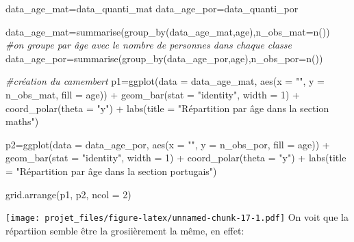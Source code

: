 \documentclass[
]{article}
\newenvironment{Shaded}{\begin{snugshade}}{\end{snugshade}}
\newcommand{\AttributeTok}[1]{\textcolor[rgb]{0.77,0.63,0.00}{#1}}
\newcommand{\CommentTok}[1]{\textcolor[rgb]{0.56,0.35,0.01}{\textit{#1}}}
\newcommand{\DecValTok}[1]{\textcolor[rgb]{0.00,0.00,0.81}{#1}}
\newcommand{\FunctionTok}[1]{\textcolor[rgb]{0.00,0.00,0.00}{#1}}
\newcommand{\NormalTok}[1]{#1}
\newcommand{\OtherTok}[1]{\textcolor[rgb]{0.56,0.35,0.01}{#1}}
\newcommand{\SpecialCharTok}[1]{\textcolor[rgb]{0.00,0.00,0.00}{#1}}
\newcommand{\StringTok}[1]{\textcolor[rgb]{0.31,0.60,0.02}{#1}}
\begin{document}
\begin{Shaded}
\begin{Highlighting}[]
\NormalTok{data\_age\_mat}\OtherTok{=}\NormalTok{data\_quanti\_mat}
\NormalTok{data\_age\_por}\OtherTok{=}\NormalTok{data\_quanti\_por}

\NormalTok{data\_age\_mat}\OtherTok{=}\FunctionTok{summarise}\NormalTok{(}\FunctionTok{group\_by}\NormalTok{(data\_age\_mat,age),}\AttributeTok{n\_obs\_mat=}\FunctionTok{n}\NormalTok{()) }\CommentTok{\#on groupe par âge avec le nombre de personnes dans chaque classe}
\NormalTok{data\_age\_por}\OtherTok{=}\FunctionTok{summarise}\NormalTok{(}\FunctionTok{group\_by}\NormalTok{(data\_age\_por,age),}\AttributeTok{n\_obs\_por=}\FunctionTok{n}\NormalTok{())}

\CommentTok{\#création du camembert}
\NormalTok{p1}\OtherTok{=}\FunctionTok{ggplot}\NormalTok{(}\AttributeTok{data =}\NormalTok{ data\_age\_mat, }\FunctionTok{aes}\NormalTok{(}\AttributeTok{x =} \StringTok{""}\NormalTok{, }\AttributeTok{y =}\NormalTok{ n\_obs\_mat, }\AttributeTok{fill =}\NormalTok{ age)) }\SpecialCharTok{+}
  \FunctionTok{geom\_bar}\NormalTok{(}\AttributeTok{stat =} \StringTok{"identity"}\NormalTok{, }\AttributeTok{width =} \DecValTok{1}\NormalTok{) }\SpecialCharTok{+}
  \FunctionTok{coord\_polar}\NormalTok{(}\AttributeTok{theta =} \StringTok{"y"}\NormalTok{) }\SpecialCharTok{+}
  \FunctionTok{labs}\NormalTok{(}\AttributeTok{title =} \StringTok{"Répartition par âge dans la section maths"}\NormalTok{)}

\NormalTok{p2}\OtherTok{=}\FunctionTok{ggplot}\NormalTok{(}\AttributeTok{data =}\NormalTok{ data\_age\_por, }\FunctionTok{aes}\NormalTok{(}\AttributeTok{x =} \StringTok{""}\NormalTok{, }\AttributeTok{y =}\NormalTok{ n\_obs\_por, }\AttributeTok{fill =}\NormalTok{ age)) }\SpecialCharTok{+}
  \FunctionTok{geom\_bar}\NormalTok{(}\AttributeTok{stat =} \StringTok{"identity"}\NormalTok{, }\AttributeTok{width =} \DecValTok{1}\NormalTok{) }\SpecialCharTok{+}
  \FunctionTok{coord\_polar}\NormalTok{(}\AttributeTok{theta =} \StringTok{"y"}\NormalTok{) }\SpecialCharTok{+}
  \FunctionTok{labs}\NormalTok{(}\AttributeTok{title =} \StringTok{"Répartition par âge dans la section portugais"}\NormalTok{)}

\FunctionTok{grid.arrange}\NormalTok{(p1, p2, }\AttributeTok{ncol =} \DecValTok{2}\NormalTok{)}
\end{Highlighting}
\end{Shaded}

\texttt{[image: projet\_files/figure-latex/unnamed-chunk-17-1.pdf]} On
voit que la répartiion semble être la grosiièrement la même, en effet:
\end{document}
